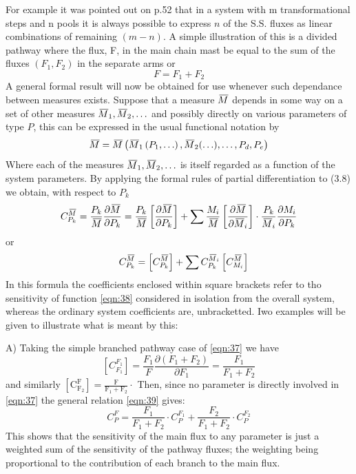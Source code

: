 For example it was pointed out on p.52 that in a system with m transformational steps and n pools it is always possible to express $n$ of the S.S. fluxes as linear combinations of remaining $(m-n)$. A simple illustration of this is a divided pathway where the flux, F, in the main chain mast be equal to the sum of the fluxes $\left(F_{1}, F_{2}\right)$ in the separate arms or
%
\begin{equation}
F = F_{1}+F_{2}
\label{eqn:37}
\end{equation}
%
A general formal result will now be obtained for use whenever such dependance between measures exists. Suppose that a measure $\,\overline{\!{M}}$ depends in some way on a set of other measures $\,\overline{\!{M}}_{1}, \,\overline{\!{M}}_{2}, \ldots$ and possibly directly on various parameters of type $P$, this can be expressed in the usual functional notation by
%
\begin{equation}
\,\overline{\!{M}} = \,\overline{\!{M}}\left(\,\overline{\!{M}}_{1}\left(P_{1}, \ldots\right), \,\overline{\!{M}}_{2}(\ldots), \ldots, P_{d}, P_{e}\right)
\label{eqn:38}
\end{equation}
%
Where each of the measures $\,\overline{\!{M}}_{1}, \,\overline{\!{M}}_{2}, \ldots$ is itself regarded as a function of the system parameters. By applying the formal rules of partial differentiation to (3.8) we obtain, with respect to $P_{k}$
%
$$
C_{P_k}^{\olsi{M}}=\frac{P_k}{\olsi{M}} \frac{\partial \olsi{M}}{\partial P_k}=\frac{P_k}{\olsi{M}}\left[\frac{\partial \olsi{M}}{\partial P_k}\right] + \sum \frac{M_i}{\olsi{M}}\left[\frac{\partial \olsi{M}}{\partial \olsi{M}_i}\right] \cdot \frac{P_k}{\olsi{M}_i} \frac{\partial M_i}{\partial P_k} $$
%
or
\begin{equation}
\quad C_{P_{k}}^{\,\overline{\!{M}}}=\left[C_{P_{k}}^{\,\overline{\!{M}}}\right]+ \sum C_{P_{k}}^{\,\overline{\!{M}}_{i}} \left[C^{\,\overline{\!{M}}}_{M_i}\right]
\label{eqn:39}
\end{equation}
%
In this formula the coefficients enclosed within square brackets refer to tho sensitivity of function \eqref{eqn:38} considered in isolation from the overall system, whereas the ordinary system coefficients are, unbracketted. Iwo examples will be given to illustrate what is meant by this:

A) Taking the simple branched pathway case of \eqref{eqn:37} we have
%
$$
\left[C_{F_{1}}^{F_{1}}\right] = \frac{F_{1}}{F} \frac{\partial\left(F_{1}+F_{2}\right)}{\partial F_{1}}=\frac{F_{1}}{F_{1}+F_{2}}
$$
%
and similarly $\left[\mathrm{C}_{\mathrm{F}_{2}}^{\mathrm{F}}\right]=\frac{\mathrm{F}}{\mathrm{F}_{1}+\mathrm{F}_{2}} \cdot$ Then, since no parameter is directly involved in \eqref{eqn:37} the general relation \eqref{eqn:39} gives:
%
\begin{equation}
C_{P}^{F}=\frac{F_{1}}{F_{1}+F_{2}} \cdot C_{P}^{F_{1}}+\frac{F_{2}}{F_{1}+F_{2}} \cdot C_{P}^{F_{2}}
\label{eqn:310}
\end{equation}
%
This shows that the sensitivity of the main flux to any parameter is just a weighted sum of the sensitivity of the pathway fluxes; the weighting being proportional to the contribution of each branch to the main flux.

